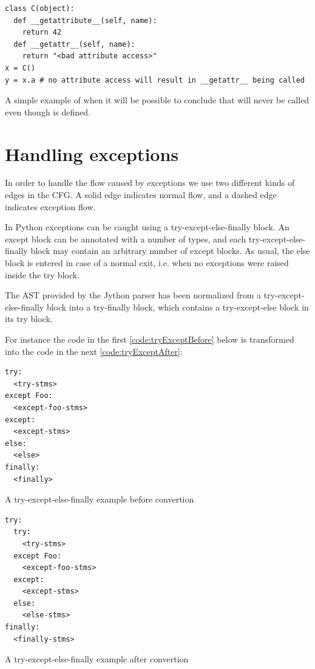 \begin{listing}[H]
  \begin{verbatim}
class C(object):
  def __getattribute__(self, name):
    return 42
  def __getattr__(self, name):
    return "<bad attribute access>"
x = C()
y = x.a # no attribute access will result in __getattr__ being called
  \end{verbatim}
  \caption{A simple example of when it will be possible to conclude that  will never be called even though  is defined.}
  \label{code:MagicMethods2}
\end{listing}









\section{Handling exceptions}
In order to handle the flow caused by exceptions we use two different kinds of edges in the CFG. 
A solid edge indicates normal flow, and a dashed edge indicates exception flow. 

In Python exceptions can be caught using a try-except-else-finally block. An except block can be annotated with a number of types, 
and each try-except-else-finally block may contain an arbitrary number of except blocks. As usual, the else block is entered in case of a normal exit, 
i.e. when no exceptions were raised inside the try block.

The AST provided by the Jython parser has been normalized from a try-except-else-finally block into a try-finally block, 
which contains a try-except-else block in its try block.

For instance the code in the first \autoref{code:tryExceptBefore} below is transformed into the code in the next \autoref{code:tryExceptAfter}:

\begin{listing}[H]
	\begin{verbatim}
try:
  <try-stms>
except Foo:
  <except-foo-stms>
except:
  <except-stms>
else: 
  <else>
finally:
  <finally>
	\end{verbatim}
	\caption{A try-except-else-finally example before convertion}\label{code:tryExceptBefore}
\end{listing}

\begin{listing}[H]
	\begin{verbatim}
try: 
  try:
    <try-stms>
  except Foo:
    <except-foo-stms>
  except:
    <except-stms>
  else:
    <else-stms>
finally:
  <finally-stms>
	\end{verbatim}
	\caption{A try-except-else-finally example after convertion}\label{code:tryExceptAfter}
\end{listing}

